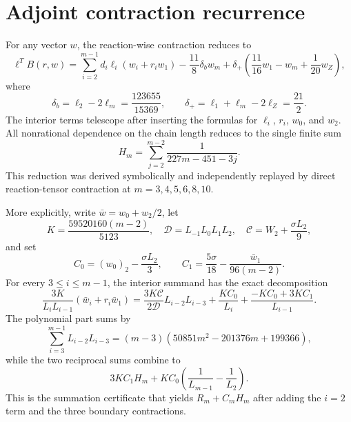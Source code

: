 \section*{Adjoint contraction recurrence}
For any vector $w$, the reaction-wise contraction reduces to
\[
\ell^TB(r,w)=
\sum_{i=2}^{m-1}d_i\ell_i(w_i+r_iw_1)
-\frac{11}{8}\delta_b w_m
+\delta_+\left(\frac{11}{16}w_1-w_m+\frac1{20}w_Z\right),
\]
where
\[
\delta_b=\ell_2-2\ell_m=\frac{123655}{15369},
\qquad
\delta_+=\ell_1+\ell_m-2\ell_Z=\frac{21}{2}.
\]
The interior terms telescope after inserting the formulas for $\ell_i$, $r_i$,
$w_0$, and $w_2$.  All nonrational dependence on the chain length reduces to
the single finite sum
\[
H_m=\sum_{j=2}^{m-2}\frac1{227m-451-3j}.
\]
This reduction was derived symbolically and independently replayed by direct
reaction-tensor contraction at $m=3,4,5,6,8,10$.

More explicitly, write $\bar w=w_0+w_2/2$, let
\[
K=\frac{59520160(m-2)}{5123},
\quad
\mathcal D=L_{-1}L_0L_1L_2,
\quad
\mathcal C=W_2+\frac{\sigma L_2}{9},
\]
and set
\[
C_0=(w_0)_2-\frac{\sigma L_2}{3},
\qquad
C_1=\frac{5\sigma}{18}-\frac{\bar w_1}{96(m-2)}.
\]
For every $3\le i\le m-1$, the interior summand has the exact decomposition
\[
\frac{3K}{L_iL_{i-1}}(\bar w_i+r_i\bar w_1)
=
\frac{3K\mathcal C}{2\mathcal D}L_{i-2}L_{i-3}
+\frac{KC_0}{L_i}
+\frac{-KC_0+3KC_1}{L_{i-1}}.
\]
The polynomial part sums by
\[
\sum_{i=3}^{m-1}L_{i-2}L_{i-3}
=(m-3)(50851m^2-201376m+199366),
\]
while the two reciprocal sums combine to
\[
3KC_1H_m+KC_0\left(\frac1{L_{m-1}}-\frac1{L_2}\right).
\]
This is the summation certificate that yields $R_m+C_mH_m$ after adding the
$i=2$ term and the three boundary contractions.
